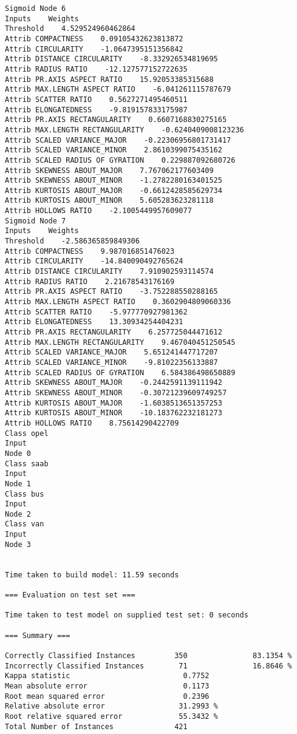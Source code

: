 \documentclass[
	article,			%
	11pt,				%
	oneside,			%
	a4paper,			%
	english,			%
	brazil,				%
	sumario=tradicional
	]{abntex2}
\begin{document}
\begin{lstlisting}
Sigmoid Node 6
Inputs    Weights
Threshold    4.529524960462864
Attrib COMPACTNESS    0.09105432623813872
Attrib CIRCULARITY    -1.0647395151356842
Attrib DISTANCE CIRCULARITY    -8.332926534819695
Attrib RADIUS RATIO    -12.127577152722635
Attrib PR.AXIS ASPECT RATIO    15.92053385315688
Attrib MAX.LENGTH ASPECT RATIO    -6.041261115787679
Attrib SCATTER RATIO    0.5627271495460511
Attrib ELONGATEDNESS    -9.819157833175987
Attrib PR.AXIS RECTANGULARITY    0.6607168830275165
Attrib MAX.LENGTH RECTANGULARITY    -0.6240409008123236
Attrib SCALED VARIANCE_MAJOR    -0.22306956801731417
Attrib SCALED VARIANCE_MINOR    2.8610399075435162
Attrib SCALED RADIUS OF GYRATION    0.229887092680726
Attrib SKEWNESS ABOUT_MAJOR    7.767062177603409
Attrib SKEWNESS ABOUT_MINOR    -1.2782280163401525
Attrib KURTOSIS ABOUT_MAJOR    -0.6612428585629734
Attrib KURTOSIS ABOUT_MINOR    5.605283623281118
Attrib HOLLOWS RATIO    -2.1005449957609077
Sigmoid Node 7
Inputs    Weights
Threshold    -2.586365859849306
Attrib COMPACTNESS    9.987016851476023
Attrib CIRCULARITY    -14.840090492765624
Attrib DISTANCE CIRCULARITY    7.910902593114574
Attrib RADIUS RATIO    2.21678543176169
Attrib PR.AXIS ASPECT RATIO    -3.752288550288165
Attrib MAX.LENGTH ASPECT RATIO    0.3602904809060336
Attrib SCATTER RATIO    -5.977770927981362
Attrib ELONGATEDNESS    13.30934254404231
Attrib PR.AXIS RECTANGULARITY    6.257725044471612
Attrib MAX.LENGTH RECTANGULARITY    9.467040451250545
Attrib SCALED VARIANCE_MAJOR    5.651241447717207
Attrib SCALED VARIANCE_MINOR    -9.81022356133887
Attrib SCALED RADIUS OF GYRATION    6.584386498650889
Attrib SKEWNESS ABOUT_MAJOR    -0.2442591139111942
Attrib SKEWNESS ABOUT_MINOR    -0.30721239609749257
Attrib KURTOSIS ABOUT_MAJOR    -1.6038513651357253
Attrib KURTOSIS ABOUT_MINOR    -10.183762232181273
Attrib HOLLOWS RATIO    8.75614290422709
Class opel
Input
Node 0
Class saab
Input
Node 1
Class bus
Input
Node 2
Class van
Input
Node 3


Time taken to build model: 11.59 seconds

=== Evaluation on test set ===

Time taken to test model on supplied test set: 0 seconds

=== Summary ===

Correctly Classified Instances         350               83.1354 %
Incorrectly Classified Instances        71               16.8646 %
Kappa statistic                          0.7752
Mean absolute error                      0.1173
Root mean squared error                  0.2396
Relative absolute error                 31.2993 %
Root relative squared error             55.3432 %
Total Number of Instances              421     


\end{lstlisting}
\end{document}
